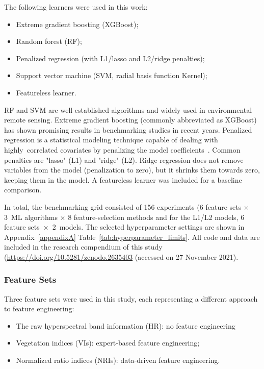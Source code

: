 \documentclass[remotesensing,article,accept,moreauthors,pdftex]{Definitions/mdpi}
\begin{document}
\begin{paracol}{2}
The following learners were used in this work:

\begin{itemize}
	\item  Extreme gradient boosting (XGBoost);
	\item  Random forest (RF);
	\item  Penalized regression (with L1/lasso and L2/ridge penalties);
	\item  Support vector machine (SVM, radial basis function Kernel);
	\item  Featureless learner.
\end{itemize}

RF and SVM are well-established algorithms and widely used in environmental remote sensing.
Extreme gradient boosting (commonly abbreviated as XGBoost) has shown promising results in benchmarking studies in recent years.
Penalized regression is a statistical modeling technique capable of dealing with highly\ correlated covariates by penalizing the model coefficients~\cite{hastie2001}.
Common penalties are "lasso" (L1) and "ridge" (L2).
Ridge regression does not remove variables from the model (penalization to zero), but it shrinks them towards zero, keeping them in the model.
A featureless learner was included for a baseline comparison.

In total, the benchmarking grid consisted of 156 experiments (6 feature sets $\times$ 3~ML algorithms $\times$ 8 feature-selection methods and for the L1/L2 models, 6 feature sets~$\times$~2~models.
The selected hyperparameter settings are shown in Appendix~\ref{appendixA} Table~\ref{tab:hyperparameter_limits}.
All code and data are included in the research compendium of this study (\url{https://doi.org/10.5281/zenodo.2635403} (accessed on 27 November 2021).


\subsubsection{Feature Sets}

Three feature sets were used in this study, each representing a different approach to feature engineering:

\begin{itemize}
	\item The raw hyperspectral band information (HR): no feature engineering %
	\item Vegetation indices (\ac{VI}s): expert-based feature engineering;
	\item Normalized ratio indices (\ac{NRI}s): data-driven feature engineering.
\end{itemize}


\end{paracol}
\end{document}
